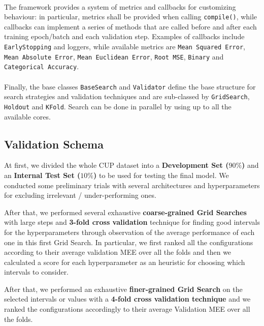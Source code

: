 \paragraph{}

The framework provides a system of metrics and callbacks for customizing behaviour: in particular, metrics shall be provided when calling \texttt{compile()}, while callbacks can implement a series of methods that are called before and after each training epoch/batch and each validation step. Examples of callbacks include \texttt{EarlyStopping} and loggers, while available metrics are \texttt{Mean Squared Error}, \texttt{Mean Absolute Error}, \texttt{Mean Euclidean Error}, \texttt{Root MSE}, \texttt{Binary} and \texttt{Categorical Accuracy}.

\paragraph{}

Finally, the base classes \texttt{BaseSearch} and \texttt{Validator} define the base structure for search strategies and validation techniques and are sub-classed by \texttt{GridSearch}, \texttt{Holdout} and \texttt{KFold}. Search can be done in parallel by using up to all the available cores.

\subsection{Validation Schema}
At first, we divided the whole CUP dataset into a \textbf{Development Set ($90\%$)} and an \textbf{Internal Test Set ($10\%$)} to be used for testing the final model. We conducted some preliminary trials with several architectures and hyperparameters for excluding irrelevant / under-performing ones.

After that, we performed several exhaustive \textbf{coarse-grained Grid Searches} with large steps and \textbf{3-fold cross validation} technique for finding good intervals for the hyperparameters through observation of the average performance of each one in this first Grid Search.
In particular, we first ranked all the configurations according to their average validation MEE over all the folds and then we calculated a score for each hyperparameter as an heuristic for choosing which intervals to consider.

After that, we performed an exhaustive \textbf{finer-grained Grid Search} on the selected intervals or values with a \textbf{4-fold cross validation technique} and we ranked the configurations accordingly to their average Validation MEE over all the folds.

